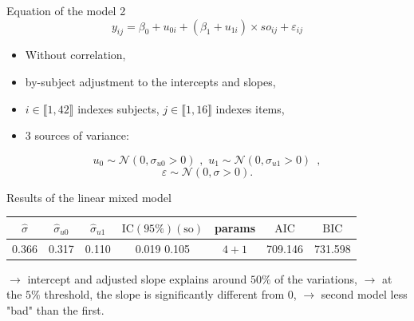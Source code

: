 \documentclass[unknownkeysallowed]{beamer}
\newcommand*{\AIC}{\mathrm{AIC}}
\newcommand*{\BIC}{\mathrm{BIC}}
\begin{document}
\begin{frame}{Equation of the model 2}
{\[y_{ij}=\beta_0+ u_{0i} + (\beta_1 + u_{1i})\times so_{ij}+\varepsilon_{ij}\]}

\medskip

 \begin{itemize}
        \item Without correlation,
        \item by-subject adjustment to the intercepts and slopes,
        \item $i \in \llbracket1,42\rrbracket$ indexes subjects, $j \in \llbracket1,16\rrbracket$ indexes items,
        \item $3$ sources of variance:
    \end{itemize}
$$u_{0} {\sim} \mathcal{N}(0, \sigma_{u0}>0) \text{ ,}\enspace u_{1} {\sim} \mathcal{N}(0, \sigma_{u1}>0)\enspace,$$
\vspace{-0.5cm}
$$\varepsilon {\sim} \mathcal{N}(0,\sigma>0).$$

\end{frame}

\begin{frame}{Results of the linear mixed model}
\begin{center}
    \begin{tabular}{|c|c|c|c|c|c|c|}
    \hline
         $\hat{\sigma}$ & $\hat{\sigma}_{u0}$ & $\hat{\sigma}_{u1}$ & $\text{IC}(95\%)(\text{so})$ & params & $\AIC$ & $\BIC$ \\
         \hline \hline
         0.366 & 0.317 & 0.110 & 0.019 0.105 & $4+1$ & 709.146 & 731.598 \\
         \hline
    \end{tabular}
\end{center}
$\longrightarrow$ intercept and adjusted slope explains around $50\%$ of the variations,
\newline
$\longrightarrow$  at the $5\%$ threshold, the slope is significantly different from $0$,
\newline
$\longrightarrow$ second model less "bad" than the first.
\end{frame}
\end{document}
